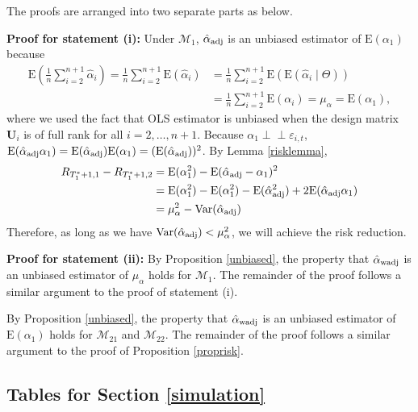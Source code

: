 \documentclass[11pt]{article}
\def\mbf#1{\mathbf{#1}} %
\newcommand{\indep}{\perp \!\!\! \perp } %
\def\mrm#1{\mathrm{#1}} %
\def\mc#1{\mathcal{#1}} %
\def\E#1{\mathrm{E}(#1)} %
\def\var#1{\mathrm{Var}(#1)} %
\theoremstyle{definition}
\newenvironment{proof-of-proposition}[1][{}]{\noindent{\bf
    Proof of Proposition {#1}}
  \hspace*{.5em}}{\qed\bigskip\\}
\begin{document}
\begin{proof-of-proposition}[\ref{proprisk}] The proofs are arranged into two separate parts as below.

 \textbf{Proof for statement (i):} Under $\mc{M}_1$, $\hat{\alpha}_{\rm adj}$ is an unbiased estimator of $\E{\alpha_1}$ because
  \begin{align*}
   \mrm{E}\left( \frac{1}{n}\sum_{i=2}^{n+1} \hat{\alpha}_i\right)
   = \frac{1}{n}\sum_{i=2}^{n+1}\E{\hat{\alpha}_i}
   &= \frac{1}{n}\sum_{i=2}^{n+1}\E{\E{\hat{\alpha}_i\mid \Theta}}\\
   &=  \frac{1}{n}\sum_{i=2}^{n+1}\E{\alpha_i}
   = \mu_{\alpha}=\E{\alpha_1},
  \end{align*}
  where we used the fact that OLS estimator is unbiased when the design matrix $\mbf{U}_i$ is of full rank for all $i = 2, \ldots, n+1$. Because $\alpha_1\indep \varepsilon_{i,t}$, $\E{\hat{\alpha}_{\rm adj}\alpha_1}=\E{\hat{\alpha}_{\rm adj}}\E{\alpha_1}=(\E{\hat{\alpha}_{\rm adj}})^2$. By Lemma \ref{risklemma}, 
    \begin{align*}
    R_{T_1^*+1,1}-R_{T_1^*+1,2}
    &=\E{\alpha_1^2}-\E{\hat{\alpha}_{\rm adj}-\alpha_1}^2\\
   & =\E{\alpha_1^2}-\E{\alpha_1^2}- \E{\hat{\alpha}_{\rm adj}^2}+2\E{\hat{\alpha}_{\rm adj}\alpha_1} \\
   &= \mu_{\alpha}^2 - \var{\hat{\alpha}_{\rm adj}} 
  \end{align*}
  Therefore, as long as we have $\var{\hat{\alpha}_{\rm adj}}<\mu_{\alpha}^2$, we will achieve the risk reduction. 

 \textbf{Proof for statement (ii):} By Proposition \ref{unbiased}, the property that $\hat{\alpha}_{\rm wadj}$ is an unbiased estimator of $\mu_{\alpha}$ holds for $\mc{M}_{1}$. The remainder of the proof follows a similar argument to the proof of statement (i).
\end{proof-of-proposition}



\begin{proof-of-proposition}[\ref{propriskwadj2}]
  By Proposition \ref{unbiased}, the property that $\hat{\alpha}_{\rm wadj}$ is an unbiased estimator of $\E{\alpha_1}$ holds for $\mc{M}_{21}$ and $\mc{M}_{22}$. The remainder of the proof follows a similar argument to the proof of Proposition \ref{proprisk}.
\end{proof-of-proposition}




\subsection{Tables for Section \ref{simulation}}
\label{tablesappendix}
\newpage
\end{document}
